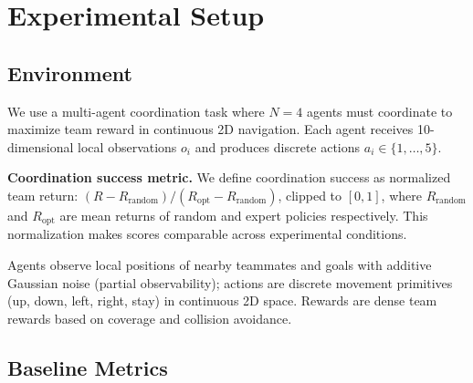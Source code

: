 \documentclass[twoside]{article}
\theoremstyle{remark}
\begin{document}







\section{Experimental Setup}

\subsection{Environment}

We use a multi-agent coordination task where $N=4$ agents must coordinate to maximize team reward in continuous 2D navigation. Each agent receives 10-dimensional local observations $o_i$ and produces discrete actions $a_i \in \{1, \ldots, 5\}$.

\textbf{Coordination success metric.} We define coordination success as normalized team return: $(R - R_{\text{random}})/(R_{\text{opt}} - R_{\text{random}})$, clipped to $[0, 1]$, where $R_{\text{random}}$ and $R_{\text{opt}}$ are mean returns of random and expert policies respectively. This normalization makes scores comparable across experimental conditions.

Agents observe local positions of nearby teammates and goals with additive Gaussian noise (partial observability); actions are discrete movement primitives (up, down, left, right, stay) in continuous 2D space. Rewards are dense team rewards based on coverage and collision avoidance.

\subsection{Baseline Metrics}
\label{sec:baseline_metrics}
\end{document}

